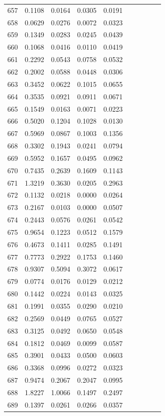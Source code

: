 \begin{table}
\begin{tabular}{cccccccccc}
657& 0.1108& 0.0164& 0.0305& 0.0191\\ 
658& 0.0629& 0.0276& 0.0072& 0.0323\\ 
659& 0.1349& 0.0283& 0.0245& 0.0439\\ 
660& 0.1068& 0.0416& 0.0110& 0.0419\\ 
661& 0.2292& 0.0543& 0.0758& 0.0532\\ 
662& 0.2002& 0.0588& 0.0448& 0.0306\\ 
663& 0.3452& 0.0622& 0.1015& 0.0655\\ 
664& 0.3535& 0.0921& 0.0911& 0.0671\\ 
665& 0.1549& 0.0163& 0.0071& 0.0223\\ 
666& 0.5020& 0.1204& 0.1028& 0.0130\\ 
667& 0.5969& 0.0867& 0.1003& 0.1356\\ 
668& 0.3302& 0.1943& 0.0241& 0.0794\\ 
669& 0.5952& 0.1657& 0.0495& 0.0962\\ 
670& 0.7435& 0.2639& 0.1609& 0.1143\\ 
671& 1.3219& 0.3630& 0.0205& 0.2963\\ 
672& 0.1132& 0.0218& 0.0000& 0.0264\\ 
673& 0.2167& 0.0103& 0.0000& 0.0507\\ 
674& 0.2443& 0.0576& 0.0261& 0.0542\\ 
675& 0.9654& 0.1223& 0.0512& 0.1579\\ 
676& 0.4673& 0.1411& 0.0285& 0.1491\\ 
677& 0.7773& 0.2922& 0.1753& 0.1460\\ 
678& 0.9307& 0.5094& 0.3072& 0.0617\\ 
679& 0.0774& 0.0176& 0.0129& 0.0212\\ 
680& 0.1442& 0.0224& 0.0143& 0.0325\\ 
681& 0.1991& 0.0355& 0.0290& 0.0210\\ 
682& 0.2569& 0.0449& 0.0765& 0.0527\\ 
683& 0.3125& 0.0492& 0.0650& 0.0548\\ 
684& 0.1812& 0.0469& 0.0099& 0.0587\\ 
685& 0.3901& 0.0433& 0.0500& 0.0603\\ 
686& 0.3368& 0.0996& 0.0272& 0.0323\\ 
687& 0.9474& 0.2067& 0.2047& 0.0995\\ 
688& 1.8227& 1.0066& 0.1497& 0.2497\\ 
689& 0.1397& 0.0261& 0.0266& 0.0357\\ 

\end{tabular}
\end{table}
